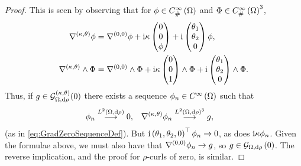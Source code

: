 \begin{proof}
	This is seen by observing that for $\phi\in C^{\infty}_{\#}\left( \Omega \right)$ and $\Phi\in C^{\infty}_{\#}\left( \Omega \right)^3$,
	\begin{align*}
		\nabla^{\left( \kappa, \theta \right)}\phi &= \nabla^{\left( 0, 0 \right)}\phi + \mathrm{i}\kappa\begin{pmatrix} 0 \\ 0 \\ \phi \end{pmatrix} + \mathrm{i}\begin{pmatrix} \theta_1 \\ \theta_2 \\ 0 \end{pmatrix}\phi, \\
		\nabla^{\left( \kappa, \theta \right)}\wedge\Phi &= \nabla^{\left( 0, 0 \right)}\wedge\Phi + \mathrm{i}\kappa\begin{pmatrix} 0 \\ 0 \\ 1 \end{pmatrix}\wedge\Phi + \mathrm{i}\begin{pmatrix} \theta_1 \\ \theta_2 \\ 0 \end{pmatrix} \wedge \Phi.
	\end{align*}
	Thus, if $g\in \mathcal{G}_{\Omega,\mathrm{d}\rho}^{\left( \kappa, \theta \right)}(0)$ there exists a sequence $\phi_n\in C^{\infty}\left( \Omega \right)$ such that
	\begin{align*}
		\phi_n \overset{L^{2}\left( \Omega,\mathrm{d} \rho \right)}{\longrightarrow} 0, &\quad \nabla^{\left( \kappa, \theta \right)}\phi_n \overset{ L^{2}\left( \Omega,\mathrm{d} \rho \right)^3 }{\longrightarrow} g,
	\end{align*}
	(as in \eqref{eq:GradZeroSequenceDef}).
	But $\mathrm{i}\left( \theta_1, \theta_2, 0 \right)^{\top}\phi_n\rightarrow 0$, as does $\mathrm{i}\kappa\phi_n$.
	Given the formulae above, we must also have that $\nabla^{\left( 0, 0 \right)}\phi_n\rightarrow g$, so $g\in \mathcal{G}_{ \Omega, \mathrm{d}\rho}\left( 0 \right)$.
	The reverse implication, and the proof for $\rho$-curls of zero, is similar.
\end{proof}

